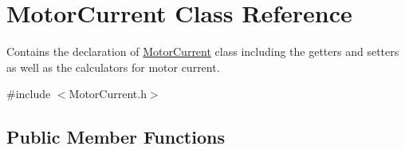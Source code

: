 \hypertarget{class_motor_current}{}\section{Motor\+Current Class Reference}
\label{class_motor_current}


Contains the declaration of \hyperlink{class_motor_current}{Motor\+Current} class including the getters and setters as well as the calculators for motor current.  




{\ttfamily \#include $<$Motor\+Current.\+h$>$}

\subsection*{Public Member Functions}
